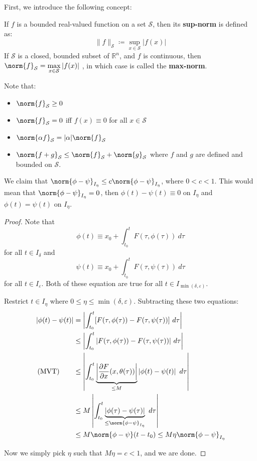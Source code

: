\documentclass[12pt]{article}
\begin{document}
First, we introduce the following concept:
\begin{definition}
If $f$ is a bounded real-valued function on a set $\mathcal{S}$, then its \textbf{sup-norm} is defined as: 
\[ \|f\|_{\mathcal{S}} \coloneqq \sup_{x \in \mathcal{S}}|f(x)| \]
If $\mathcal{S}$ is a closed, bounded subset of $\mathbb{R}^n$, and $f$ is continuous, then $\norm{f}_{\mathcal{S}} = \displaystyle\max_{x \in \mathcal{S}}|f(x)|$ , in which case is called the \textbf{max-norm}.
\end{definition}

Note that:
\begin{itemize}
\item $\norm{f}_{\mathcal{S}} \ge 0$
\item $\norm{f}_{\mathcal{S}} = 0$ iff $f(x) \equiv 0$ for all $x \in \mathcal{S}$
\item $\norm{\alpha f}_{\mathcal{S}} = |\alpha|\norm{f}_{\mathcal{S}}$
\item $\norm{f + g}_{\mathcal{S}} \le \norm{f}_{\mathcal{S}} + \norm{g}_{\mathcal{S}}$ where $f$ and $g$ are defined and bounded on $\mathcal{S}$.
\end{itemize}

We claim that $\norm{\phi - \psi}_{I_{\eta}} \le c \norm{\phi - \psi}_{I_{\eta}}$, where $0 < c < 1$. This would mean that $\norm{\phi - \psi}_{I_{\eta}} = 0$, then $\phi(t) - \psi(t) \equiv 0$ on $I_{\eta}$ and $\phi(t) = \psi(t)$ on $I_{\eta}$.

\begin{proof}
Note that \[ \phi(t) \equiv x_0 + \int_{t_0}^tF(\tau, \phi(\tau)) \ d\tau \] for all $t \in I_{\delta}$ and \[ \psi(t) \equiv x_0 + \int_{t_0}^t F(\tau,\psi(\tau)) \ d\tau \] for all $t \in I_{\varepsilon}$. Both of these equation are true for all $t \in I_{\min(\delta,\varepsilon)}$.

Restrict $t \in I_{\eta}$ where $0 \le \eta \le \min(\delta,\varepsilon)$. Subtracting these two equations:
\[ 
\begin{aligned}
|\phi(t) - \psi(t)| &= \left| \int_{t_0}^t[F(\tau,\phi(\tau)) - F(\tau,\psi(\tau))] \ d\tau \right| \\
&\le \left| \int_{t_0}^t|F(\tau,\phi(\tau)) - F(\tau,\psi(\tau))| \ d\tau\right| \\
\text{(MVT)} \qquad &\le \left| \int_{t_0}^t\underbrace{\left|\frac{\partial F}{\partial x}(x,\theta(\tau))\right|}_{\le M}\left|\phi(t) - \psi(t)\right| \ d\tau \right| \\
&\le M\left|\int_{t_0}^t\underbrace{|\phi(\tau) - \psi(\tau)|}_{\le \norm{\phi - \psi}_{I_{\eta}}} \ d\tau \right| \\
&\le M\norm{\phi - \psi}(t-t_0) \le M\eta\norm{\phi - \psi}_{I_{\eta}}
\end{aligned}
\]

Now we simply pick $\eta$ such that $M\eta = c < 1$, and we are done. 
\end{proof}
\end{document}
